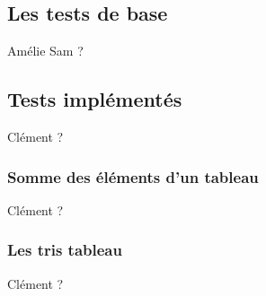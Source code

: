 \subsection{Les tests de base}
Amélie Sam ?
\subsection{Tests implémentés}
Clément ?
\subsubsection{Somme des éléments d'un tableau}
Clément ?
\subsubsection{Les tris tableau}
Clément ?